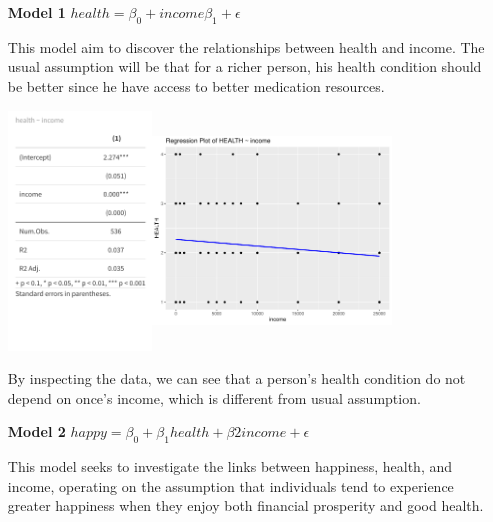 \documentclass{article}[13pt]
\begin{document}
\begin{enumerate}
    \item[\textbf{Model 1}] $health = \beta_0 + income\beta_1 + \epsilon$

\qquad This model aim to discover the relationships between health and income. The usual assumption 
will be that for a richer person, his health condition should be better since he have access to better 
medication resources.

\includegraphics[width=0.3\textwidth, height=2.5in]{health~income_table.png}\includegraphics[width=0.5\textwidth, height=2.5in]{health~income_regression.pdf}

\qquad By inspecting the data, we can see that a person's health condition do not depend on once's income, which is different from usual assumption.

    \item[\textbf{Model 2}] $happy = \beta_0 + \beta_1health + \beta2income + \epsilon$
    
\qquad This model seeks to investigate the links between happiness, health, and income, operating on the 
assumption that individuals tend to experience greater happiness when they enjoy both financial prosperity 
and good health.


\end{enumerate}
\end{document}
